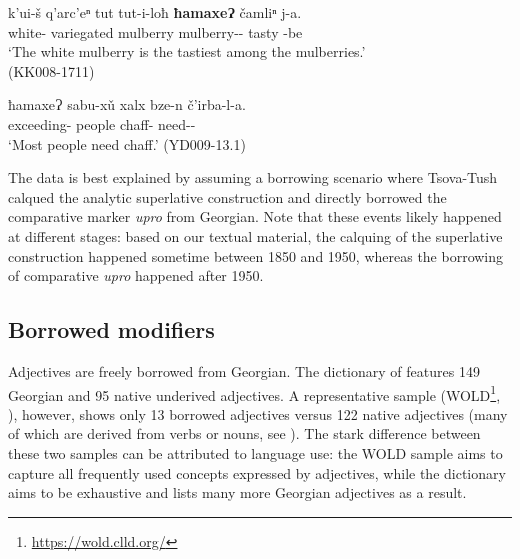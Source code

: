 \begin{exe}
	\ex\label{agreement-ex04}
	\begin{xlist}
		
		
			\ex\label{agreement-ex04a}
			\gll k'ui-š q'arc'eⁿ tut tut-i-loħ \textbf{ħamaxeɁ} čamliⁿ j-a.  \\
			white-{\Adv} variegated mulberry mulberry-{\Pl}-{\Interlat} \textbf{{\Superl}} tasty {\J}-be \\
			\trans `The white mulberry is the tastiest among the mulberries.' \\
			\hfill (KK008-1711)
		
		
		
			\ex\label{agreement-ex04b}
			\gll ħamaxeɁ sabu-xǔ xalx bze-n č'irba-l-a. \\
			{\Superl}	exceeding-{\Cmp} people chaff-{\Dat} need-{\Intr}-{\Npst}\\
			\trans `Most people need chaff.'
			\hfill (YD009-13.1)
		
		
	\end{xlist}
\end{exe}

The data is best explained by assuming a borrowing scenario where Tsova-Tush calqued the analytic superlative construction and directly borrowed the comparative marker \textit{upro} from Georgian. Note that these events likely happened at different stages: based on our textual material, the calquing of the superlative construction happened sometime between 1850 and 1950, whereas the borrowing of comparative \textit{upro} happened after 1950.

\subsection{Borrowed modifiers} \label{adjadapt}

Adjectives are freely borrowed from Georgian. The dictionary of \textcite[]{kadkad84} features 149 Georgian and 95 native underived adjectives. A representative sample (WOLD\footnote{\url{https://wold.clld.org/}}, \cite{haspelmathtadmor09wold}), however, shows only 13 borrowed adjectives versus 122 native adjectives (many of which are derived from verbs or nouns, see \textcite{WS}). The stark difference between these two samples can be attributed to language use: the WOLD sample aims to capture all frequently used concepts expressed by adjectives, while the dictionary aims to be exhaustive and lists many more Georgian adjectives as a result.

